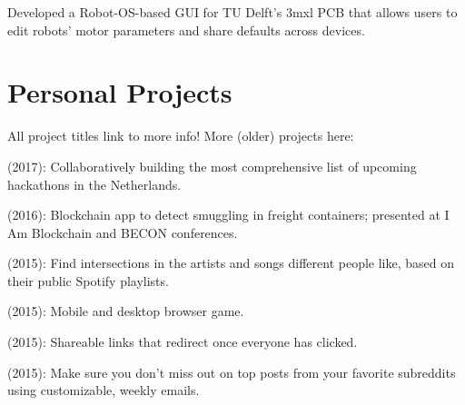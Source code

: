 \documentclass[]{deedy-resume-openfont}
\begin{document}
\begin{minipage}[t]{0.66\textwidth}
\begin{tightemize}
    \item Developed a Robot-OS-based GUI for TU Delft's 3mxl PCB that allows users to edit robots' motor parameters and share defaults across devices.
\end{tightemize}
\vspace{0.5\topsep}


\section{Personal Projects}

All project titles link to more info! More (older) projects here: \href{http://leonoverweel.com/}{}

\begin{tightemize}
    \item \href{http://hackathonlist.nl/}{} (2017): Collaboratively building the most comprehensive list of upcoming hackathons in the Netherlands.
    \item \href{http://leonoverweel.com/world-port-hackathon-2016}{} (2016): Blockchain app to detect smuggling in freight containers; presented at I Am Blockchain and BECON conferences.
    \item \href{http://leonoverweel.com/intersect.ninja}{} (2015): Find intersections in the artists and songs different people like, based on their public Spotify playlists.
    \item \href{http://leonoverweel.com/arc-spin}{} (2015): Mobile and desktop browser game.
    \item \href{http://leonoverweel.com/link-syncer}{} (2015): Shareable links that redirect once everyone has clicked. \item \href{http://leonoverweel.com/reddit-weekly}{} (2015): Make sure you don’t miss out on top posts from your favorite subreddits using customizable, weekly emails.
\end{tightemize}
\sectionsep



\end{minipage}
\end{document}
